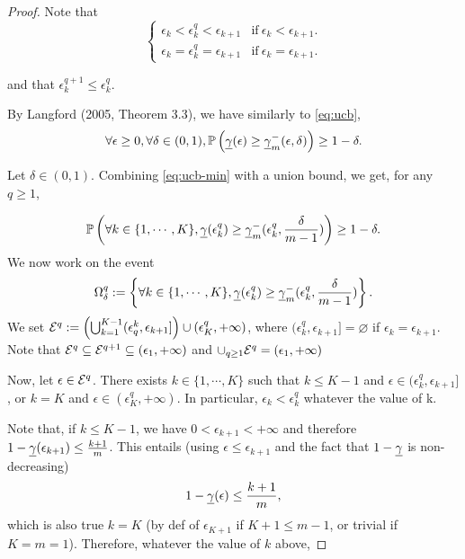 \begin{proof}
    Note that 
    \begin{equation*}
        \begin{cases}
            \epsilon_k < \epsilon_k^q < \epsilon_{k+1} & \text{if} \ \epsilon_k < \epsilon_{k+1}. \\
            \epsilon_k = \epsilon_k^q = \epsilon_{k+1} & \text{if} \ \epsilon_k = \epsilon_{k+1}.
        \end{cases}
    \end{equation*}

    and that $\epsilon_k^{q+1} \leq \epsilon_k^q$. 


    By Langford (2005, Theorem 3.3), we have similarly  to \eqref{eq:ucb},
    \begin{equation}
    \label{eq:ucb-min}
        \forall \epsilon \geq 0, \forall \delta \in (0,1), \mathbb{P}\left(\underline{\gamma}(\epsilon)\geq \underline{\gamma}_{m}^{-}(\epsilon,\delta)\right)\geq 1-\delta.
    \end{equation}
        
    Let $\delta\in(0,1)$. Combining \eqref{eq:ucb-min} with a union bound, we get, for any $q\geq 1$,

    \begin{equation}
        \label{eq:uni-min}
        \mathbb{P}\left( \forall k \in \{ 1,\cdots, K\}, \underline{\gamma}(\epsilon^q_k) \geq \underline{\gamma}_{m}^{-}(\epsilon_k^q,\frac{\delta}{m-1})\right)\geq 1-\delta.
    \end{equation}
    We now work on the event 
    $$
        \Omega_\delta^q := \left\{ \forall k \in \{ 1,\cdots, K \}, \underline{\gamma}(\epsilon_k^q)\geq \underline{\gamma}_{m}^{-}(\epsilon^q_k, \frac{\delta}{m-1})\right\}.
    $$
    We set $\mathcal{E}^q := \left( \bigcup_{k=1}^{K-1} (\epsilon_q^k, \epsilon_{k+1}] \right) \cup (\epsilon_K^q, +\infty)$,
    where $(\epsilon^q_k,\epsilon_{k+1}]=\varnothing$ if $\epsilon_k = \epsilon_{k+1}$.
    Note that $\mathcal{E}^q \subseteq \mathcal{E}^{q+1} \subseteq (\epsilon_1, +\infty)$ and $\cup_{q\geq 1}\mathcal{E}^q = (\epsilon_1, +\infty)$

    Now, let $\epsilon \in \mathcal{E}^q$. There exists $k\in\{1,\cdots,K\}$ such that $k\leq K-1$ and $\epsilon \in (\epsilon_k^q, \epsilon_{k+1}]$, or $k=K$ and $\epsilon\in(\epsilon^q_K, +\infty)$. In particular, $\epsilon_k < \epsilon_k^q$ whatever the value of k.

    Note that, if $k \leq K-1$, we have $0<\epsilon_{k+1}<+\infty$ and therefore $1-\underline{\gamma}(\epsilon_{k+1})\leq\frac{k+1}{m}$.
    This entails (using $\epsilon\leq\epsilon_{k+1}$ and the fact that $1-\underline{\gamma}$ is non-decreasing)
    $$
        1-\underline{\gamma}(\epsilon)\leq\frac{k+1}{m},
    $$
    which is also true $k=K$ (by def of $\epsilon_{K+1}$ if $K+1\leq m-1$, or trivial if $K=m=1$).
    Therefore, whatever the value of $k$ above,


\end{proof}
